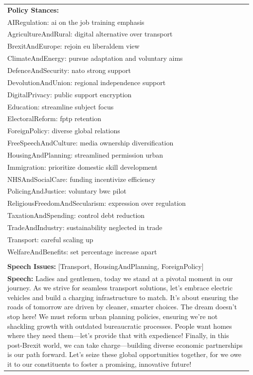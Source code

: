 \documentclass[11pt]{article}
\begin{document}
\begin{table}[ht]
\begin{tabularx}{\textwidth}{X}
\textbf{Policy Stances:} \\
AIRegulation: ai on the job training emphasis \\
AgricultureAndRural: digital alternative over transport \\
BrexitAndEurope: rejoin eu liberaldem view \\
ClimateAndEnergy: pursue adaptation and voluntary aims \\
DefenceAndSecurity: nato strong support \\
DevolutionAndUnion: regional independence support \\
DigitalPrivacy: public support encryption \\
Education: streamline subject focus \\
ElectoralReform: fptp retention \\
ForeignPolicy: diverse global relations \\
FreeSpeechAndCulture: media ownership diversification \\
HousingAndPlanning: streamlined permission urban \\
Immigration: prioritize domestic skill development \\
NHSAndSocialCare: funding incentivize efficiency \\
PolicingAndJustice: voluntary bwc pilot \\
ReligiousFreedomAndSecularism: expression over regulation \\
TaxationAndSpending: control debt reduction \\
TradeAndIndustry: sustainability neglected in trade \\
Transport: careful scaling up \\
WelfareAndBenefits: set percentage increase apart \\
\\[4pt]

\textbf{Speech Issues:} [Transport, HousingAndPlanning, ForeignPolicy] \\[4pt]

\textbf{Speech:} Ladies and gentlemen, today we stand at a pivotal moment in our journey. As we strive for seamless transport solutions, let's embrace electric vehicles and build a charging infrastructure to match. It's about ensuring the roads of tomorrow are driven by cleaner, smarter choices. The dream doesn't stop here! We must reform urban planning policies, ensuring we're not shackling growth with outdated bureaucratic processes. People want homes where they need them—let’s provide that with expedience! Finally, in this post-Brexit world, we can take charge—building diverse economic partnerships is our path forward. Let's seize these global opportunities together, for we owe it to our constituents to foster a promising, innovative future! \\[4pt]


\end{tabularx}
\end{table}
\end{document}
